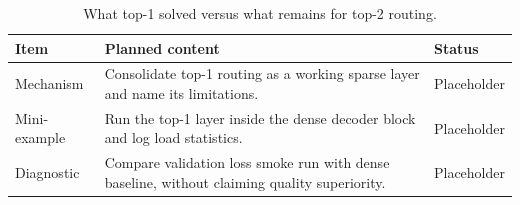 \begin{table}[H]
\centering
\caption{What top-1 solved versus what remains for top-2 routing.}
\label{tab:ch04-chapter-summary-and-handoff}
\begin{tabularx}{\textwidth}{p{}X p{}}
\toprule
Item & Planned content & Status \\
\midrule
Mechanism & Consolidate top-1 routing as a working sparse layer and name its limitations. & Placeholder \\
Mini-example & Run the top-1 layer inside the dense decoder block and log load statistics. & Placeholder \\
Diagnostic & Compare validation loss smoke run with dense baseline, without claiming quality superiority. & Placeholder \\
\bottomrule
\end{tabularx}
\end{table}
